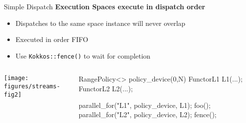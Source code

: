 
\begin{frame}[fragile]{Simple Dispatch}
  \textbf{Execution Spaces execute in dispatch order}
  \begin{itemize}
    \item{Dispatches to the same space instance will never overlap}
    \item{Executed in order FIFO}
    \item{Use \texttt{Kokkos::fence()} to wait for completion}
  \end{itemize}

  \begin{columns}[]
    \begin{column}{.67\textwidth}

       \texttt{[image: figures/streams-fig2]} 
 
    \end{column}

    \begin{column}{.33\textwidth}
	    \begin{code}[linebackgroundcolor={\btLstHL{8}{black!15}},keywords={L1,L2,policy_device}]
RangePolicy<> 
  policy_device(0,N)
FunctorL1 L1(...);
FunctorL2 L2(...);

parallel_for("L1", 
  policy_device, L1);
foo();
parallel_for("L2", 
  policy_device, L2);
fence();
      \end{code}
    \end{column}
  \end{columns}
\end{frame}


